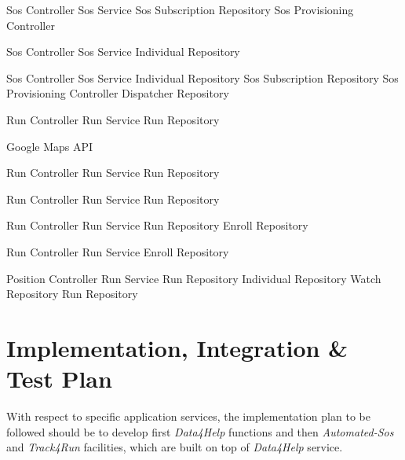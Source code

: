 \documentclass[a4paper]{article}
\begin{document}
\begin{description}
     {Sos Controller}
     {Sos Service}
     {Sos Subscription Repository}
     {Sos Provisioning Controller}
     
     {Sos Controller}
     {Sos Service}
     {Individual Repository}
     
     {Sos Controller}
     {Sos Service}
     {Individual Repository}
     {Sos Subscription Repository}
     {Sos Provisioning Controller}
     {Dispatcher Repository}
     
     {Run Controller}
     {Run Service}
     {Run Repository}
     
     {Google Maps API}
     
     {Run Controller}
     {Run Service}
     {Run Repository}
     
     {Run Controller}
     {Run Service}
     {Run Repository}
     
     {Run Controller}
     {Run Service}
     {Run Repository}
     {Enroll Repository}
     
     {Run Controller}
     {Run Service}
     {Enroll Repository}
     
     {Position Controller}
     {Run Service}
     {Run Repository}
     {Individual Repository}
     {Watch Repository}
     {Run Repository}

     
\end{description}

\newpage
\section{Implementation, Integration \& Test Plan}
With respect to specific application services, the implementation plan to be followed should be to develop first \textit{Data4Help} functions and then \textit{Automated-Sos} and \textit{Track4Run} facilities, which are built on top of \textit{Data4Help} service.\\
\end{document}
